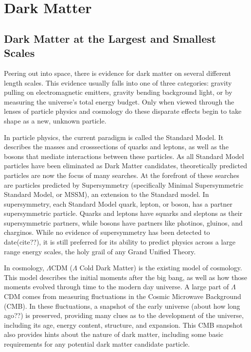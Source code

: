 \cleartooddpage[\thispagestyle{empty}]
\chapter{Dark Matter}

\section{Dark Matter at the Largest and Smallest Scales} %

Peering out into space, there is evidence for dark matter on several different length scales.
This evidence usually falls into one of three categories: gravity pulling on electromagnetic emitters, gravity bending background light, or by measuring the universe's total energy budget.
Only when viewed through the lenses of particle physics and cosmology do these disparate effects begin to take shape as a new, unknown particle.

In particle physics, the current paradigm is called the Standard Model.
It describes the masses and crosssections of quarks and leptons, as well as the bosons that mediate interactions between these particles.
As all Standard Model particles have been eliminated as Dark Matter candidates, theoretically predicted particles are now the focus of many searches.
At the forefront of these searches are particles predicted by Supersymmetry (specifically Minimal Supersymmetric Standard Model, or MSSM), an extension to the Standard model.
In supersymmetry, each Standard Model quark, lepton, or boson, has a partner supersymmetric particle.
Quarks and leptons have squarks and sleptons as their supersymmetric partners, while bosons have partners like photinos, gluinos, and charginos.
While no evidence of supersymmetry has been detected to date(cite??), it is still preferred for its ability to predict physics across a large range energy scales, the holy grail of any Grand Unified Theory.

In cosmology, $\Lambda$CDM ($\Lambda$ Cold Dark Matter) is the existing model of cosmology.
This model describes the initial moments after the big bang, as well as how those moments evolved through time to the modern day universe.
A large part of $\Lambda$CDM comes from measuring fluctuations in the Cosmic Microwave Background (CMB).
In these fluctuations, a snapshot of the early universe (about how long ago??) is preserved, providing many clues as to the development of the universe, including its age, energy content, structure, and expansion.
This CMB snapshot also provides hints about the nature of dark matter, including some basic requirements for any potential dark matter candidate particle.

